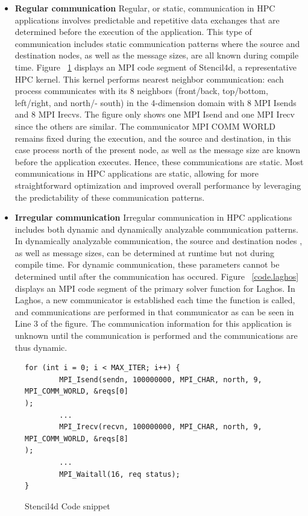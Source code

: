 \begin{itemize}
\item \textbf{Regular communication} Regular, or static, communication in HPC applications involves predictable and repetitive data exchanges that are determined before the execution of the application. This type of communication includes static communication patterns where the source and destination nodes, as well as the message sizes, are all known during compile time. Figure ~\ref{code.stencil} displays an MPI code segment of Stencil4d, a representative HPC kernel.
This kernel performs nearest neighbor communication: each process communicates with its 8 neighbors (front/back, top/bottom, left/right, and north/- south) in the 4-dimension domain with 8 MPI Isends and 8 MPI Irecvs. The figure only shows one MPI Isend and one MPI Irecv since the others are similar. The communicator MPI COMM WORLD remains fixed during the execution, and the source and destination, in this case process north of the present node, as well as the message size are known before the application executes. Hence, these communications are static. 
Most communications in HPC applications are static, allowing for more straightforward optimization and improved overall performance by leveraging the predictability of these communication patterns.

\item \textbf{Irregular communication} Irregular communication in HPC applications includes both dynamic and 
dynamically analyzable communication patterns. 
In dynamically analyzable communication, the source and destination nodes
, as well as message sizes, can be determined at runtime but not 
during compile time. For dynamic communication, these parameters cannot be determined 
until after the communication has occured. Figure ~\ref{code.laghos} displays an MPI code segment of the primary solver function for Laghos. In Laghos, a new communicator is established each time the function is called, and communications are performed in that communicator as can be seen in Line 3 of the figure. The communication information for this application is unknown until the communication is performed and the communications are thus dynamic.

\end{itemize}

\begin{figure}[hbtp]
\caption{Stencil4d Code snippet}
\label{code.stencil}
\begin{lstlisting}[breaklines]
for (int i = 0; i < MAX_ITER; i++) {
        MPI_Isend(sendn, 100000000, MPI_CHAR, north, 9, MPI_COMM_WORLD, &reqs[0]
);
        ...
        MPI_Irecv(recvn, 100000000, MPI_CHAR, north, 9, MPI_COMM_WORLD, &reqs[8]
);
        ...
        MPI_Waitall(16, req status);
}
\end{lstlisting}
\end{figure}

